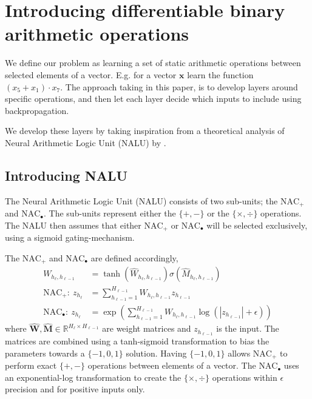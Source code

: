 \section{Introducing differentiable binary arithmetic operations}
\label{sec:Nalu}
We define our problem as learning a set of static arithmetic operations between selected elements of a vector. E.g. for a vector $\mathbf{x}$ learn the function ${(x_5 + x_1) \cdot x_7}$. The approach taking in this paper, is to develop layers around specific operations, and then let each layer decide which inputs to include using backpropagation.

We develop these layers by taking inspiration from a theoretical analysis of Neural Arithmetic Logic Unit (NALU) by \citet{trask-nalu}.

\subsection{Introducing NALU}
The Neural Arithmetic Logic Unit (NALU) consists of two sub-units; the $\text{NAC}_{+}$ and $\text{NAC}_{\bullet}$. The sub-units represent either the $\{+, -\}$ or the $\{\times, \div \}$ operations. The NALU then assumes that either $\text{NAC}_{+}$ or $\text{NAC}_{\bullet}$ will be selected exclusively, using a sigmoid gating-mechanism.

The $\text{NAC}_{+}$ and $\text{NAC}_{\bullet}$ are defined accordingly,
\begin{align}
W_{h_\ell, h_{\ell-1}} &= \tanh(\hat{W}_{h_\ell, h_{\ell-1}}) \sigma(\hat{M}_{h_\ell, h_{\ell-1}}) \label{eq:weight}\\
\textrm{NAC}_+:\ z_{h_\ell} &= \sum_{h_{\ell-1}=1}^{H_{\ell-1}} W_{h_{\ell}, h_{\ell-1}} z_{h_{\ell-1}} \label{eq:naca}\\
\textrm{NAC}_\bullet:\ z_{h_\ell} &= \exp\left(\sum_{h_{\ell-1}=1}^{H_{\ell-1}} W_{h_{\ell}, h_{\ell-1}} \label{eq:nacm}\log(|z_{h_{\ell-1}}| + \epsilon) \right)
\end{align}
where $\hat{\mathbf{W}}, \hat{\mathbf{M}} \in \mathbb{R}^{H_{\ell} \times H_{\ell-1}}$ are weight matrices and $z_{h_{\ell-1}}$ is the input. The matrices are combined using a tanh-sigmoid transformation to bias the parameters towards a $\{-1,0,1\}$ solution. Having $\{-1,0,1\}$ allows $\text{NAC}_{+}$ to perform exact $\{+, -\}$ operations between elements of a vector.
The $\text{NAC}_{\bullet}$ uses an exponential-log transformation to create the $\{\times, \div \}$ operations within $\epsilon$ precision and for positive inputs only.

